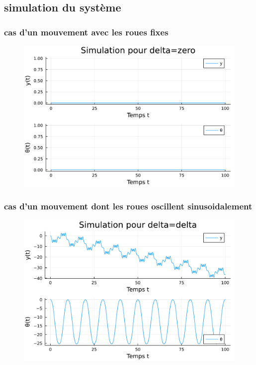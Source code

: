 \documentclass[11pt,a4paper]{article}
\begin{document}
\subsection{simulation du système}
\subsubsection{cas d'un mouvement avec les roues fixes}
\begin{figure}[!h]
	\centering
	\includegraphics[width=0.95\linewidth]{../code/jlplots/Q1_3_zero.pdf}
\end{figure}
\newpage
\subsubsection{cas d'un mouvement dont les roues oscillent sinusoidalement}
\begin{figure}[!h]
	\centering
	\includegraphics[width=0.95\linewidth]{../code/jlplots/Q1_3_delta.pdf}
\end{figure}
\end{document}
